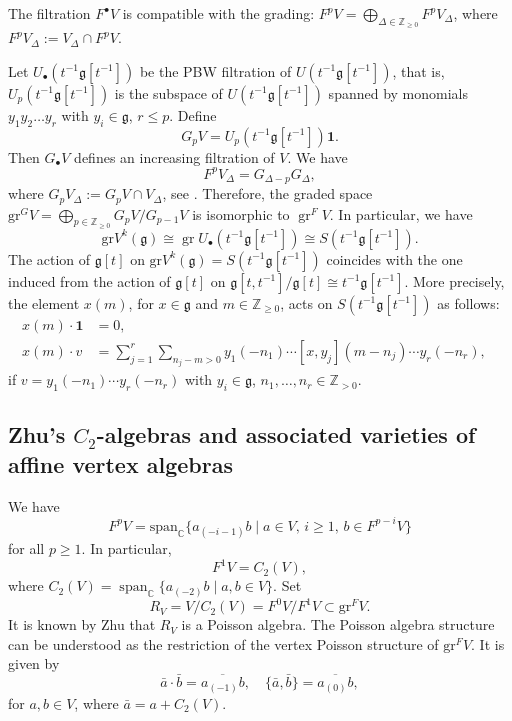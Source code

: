 \documentclass[11pt]{article}
\newcommand{\Subsection}{\subsection}
\numberwithin{equation}{section}
\newcommand{\sbullet}{{\scriptscriptstyle\bullet}}
\let\on\operatorname
\newcommand\C{{\mathbb C}}
\newcommand\Z{{\mathbb Z}}
\newcommand \g{\mathfrak g}
\newcommand\gr{\mathrm{gr}V^{k}({\mathfrak g})}
\theoremstyle{definition}
\begin{document}
The filtration $F^\sbullet V$
is compatible with the grading:
$F^pV=\bigoplus_{\Delta\in \Z_{\geq 0}}F^pV_{\Delta}$,
where
$F^p V_\Delta := V_\Delta \cap F^p V$.

Let $U_{\sbullet}(t^{-1}\g[t^{-1}])$ be the PBW filtration of
$U(t^{-1}\g[t^{-1}])$,
that is,
$U_{p}(t^{-1}\g[t^{-1}])$
is the subspace of $U(t^{-1}\g[t^{-1}])$
spanned by monomials $y_{1} y_{2} \dots y_{r}$ with $y_i \in \g$,
$r\leq p$.
Define
\begin{equation*}
G_p V= U_{p}(t^{-1}\g[t^{-1}])\mathbf{1}.
\end{equation*}
Then $G_\sbullet V$ defines an increasing filtration of $V$.
We have
\begin{equation}
F^p V_{\Delta}=G_{\Delta-p}G_{\Delta},
\end{equation}
where
$G_p V_{\Delta}:=G_p V\cap V_{\Delta}$,
see \cite[Prop.\,2.6.1]{Ara12}.
Therefore,
the graded space $\mathrm{gr}^G V = \bigoplus_{p \in \Z_{\geq 0}}
G_p V/G_{p-1}V$ is isomorphic to $\on{gr}^F V$.
In particular,
we have
\[
\gr\cong \on{gr}U_{\sbullet}(t^{-1}\g[t^{-1}])\cong S(t^{-1}\g[t^{-1}]).
\]
The action of $\g[t]$ on $\gr=S(t^{-1}\g[t^{-1}])$
coincides with the one
induced from the action of $\g[t]$ on
$\g[t,t^{-1}]/\g[t] \cong t^{-1}\g[t^{-1}]$.
More precisely,
the element $x(m)$, for $x \in \g$ and $m \in \Z_{\geq 0}$,
acts on $S(t^{-1}\g[t^{-1}])$ as follows:
\begin{align}\nonumber
x(m)\cdot\mathbf{1} &=0, & \\\label{eq:action}
x(m) \cdot v &= \sum_{j=1}^r
\sum_{n_{j}-m >0} y_{1}(-n_1)\cdots
[x,y_{{j}}] (m- n_{j})
\cdots y_{r}(-n_r),
\end{align}
if $v =y_{1}(-n_1)\cdots y_{r}(-n_r)$
with $y_i \in \g$, $n_1,\dots,n_r \in \Z_{>0}$.

\Subsection{Zhu's $C_2$-algebras and associated varieties
of affine vertex algebras}
\label{sub:Zhu affine vertex algebras}

We have \cite[Lem.\,2.9]{Li05}
\[
F^p V = \mathrm{span}_\C\{ a_{(-i-1)} b \mid a \in V,\, i \geq 1,\, b \in F^{p-i} V \}
\]
for all $p \geq 1$. In particular,
\[
F^1 V = C_2(V),
\]
where $C_2(V)=\on{span}_{\C}\{a_{(-2)}b\mid a,b\in V\}$.
Set
\[
R_V = V/C_2(V) = F^0 V / F^1 V \subset \mathrm{gr}^FV.
\]
It is known by Zhu \cite{Zhu96} that $R_V$ is a Poisson algebra.
The Poisson algebra structure can be understood as the restriction of the vertex Poisson structure of $\mathrm{gr}^FV$. It is given by
\[
\bar a \cdot \bar b = \overline{a_{(-1)} b}, \quad \{\bar a, \bar b\}= \overline{a_{(0)}b},
\]
for $a, b \in V$, where $\bar a = a+C_2(V)$.
\end{document}
